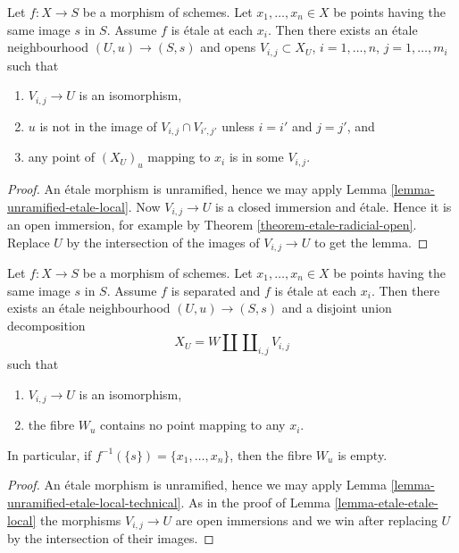 \begin{lemma}
\label{lemma-etale-etale-local}
Let $f : X \to S$ be a morphism of schemes.
Let $x_1, \ldots, x_n \in X$ be points having the same image $s$ in $S$.
Assume $f$ is \'etale at each $x_i$.
Then there exists an \'etale neighbourhood $(U, u) \to (S, s)$
and opens $V_{i, j} \subset X_U$, $i = 1, \ldots, n$, $j = 1, \ldots, m_i$
such that
\begin{enumerate}
\item $V_{i, j} \to U$ is an isomorphism,
\item $u$ is not in the image of $V_{i, j} \cap V_{i', j'}$ unless
$i = i'$ and $j = j'$, and
\item any point of $(X_U)_u$ mapping to $x_i$ is in some $V_{i, j}$.
\end{enumerate}
\end{lemma}

\begin{proof}
An \'etale morphism is unramified, hence we may apply
Lemma \ref{lemma-unramified-etale-local}.
Now $V_{i, j} \to U$ is a closed immersion and \'etale.
Hence it is an open immersion, for example by
Theorem \ref{theorem-etale-radicial-open}.
Replace $U$ by the intersection of the images of $V_{i, j} \to U$
to get the lemma.
\end{proof}

\begin{lemma}
\label{lemma-etale-etale-local-technical}
Let $f : X \to S$ be a morphism of schemes.
Let $x_1, \ldots, x_n \in X$ be points having the same image $s$ in $S$.
Assume $f$ is separated and $f$ is \'etale at each $x_i$.
Then there exists an \'etale neighbourhood $(U, u) \to (S, s)$
and a disjoint union decomposition
$$
X_U =
W \amalg \coprod\nolimits_{i, j} V_{i, j}
$$
such that
\begin{enumerate}
\item $V_{i, j} \to U$ is an isomorphism,
\item the fibre $W_u$ contains no point mapping to any $x_i$.
\end{enumerate}
In particular, if $f^{-1}(\{s\}) = \{x_1, \ldots, x_n\}$, then
the fibre $W_u$ is empty.
\end{lemma}

\begin{proof}
An \'etale morphism is unramified, hence we may apply
Lemma \ref{lemma-unramified-etale-local-technical}.
As in the proof of
Lemma \ref{lemma-etale-etale-local}
the morphisms $V_{i, j} \to U$ are open immersions and
we win after replacing $U$ by the intersection of their
images.
\end{proof}

